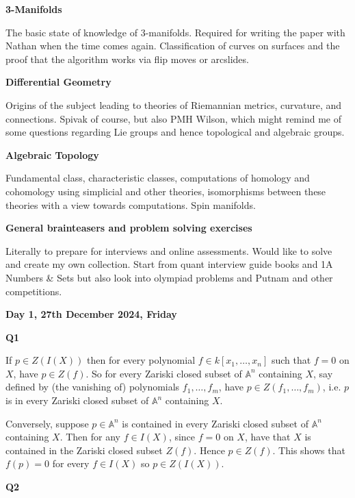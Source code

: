 \documentclass[hidelinks, 12pt]{article}
\theoremstyle{mydefstyle}
\theoremstyle{mythmstyle}
\begin{document}
\textbf{3-Manifolds}

The basic state of knowledge of 3-manifolds. Required for writing the paper with Nathan when the time comes again. Classification of curves on surfaces and the proof that the algorithm works via flip moves or arcslides. 

\textbf{Differential Geometry}

Origins of the subject leading to theories of Riemannian metrics, curvature, and connections. Spivak of course, but also PMH Wilson, which might remind me of some questions regarding Lie groups and hence topological and algebraic groups. 

\textbf{Algebraic Topology}

Fundamental class, characteristic classes, computations of homology and cohomology using simplicial and other theories, isomorphisms between these theories with a view towards computations. Spin manifolds. 

\textbf{General brainteasers and problem solving exercises}

Literally to prepare for interviews and online assessments. Would like to solve and create my own collection. Start from quant interview guide books and 1A Numbers \& Sets but also look into olympiad problems and Putnam and other competitions. 

\newpage

\textbf{Day 1, 27th December 2024, Friday}

\textbf{Q1} 

If $p \in Z(I(X))$ then for every polynomial $f \in k[x_1, \dots, x_n]$ such that $f = 0$ on $X$, have $p \in Z(f)$. So for every Zariski closed subset of $\mathbb{A}^n$ containing $X$, say defined by (the vanishing of) polynomials $f_1, \dots, f_m$, have $p \in Z(f_1, \dots, f_m)$, i.e. $p$ is in every Zariski closed subset of $\mathbb{A}^n$ containing $X$.

Conversely, suppose $p \in \mathbb{A}^n$ is contained in every Zariski closed subset of $\mathbb{A}^n$ containing $X$. Then for any $f \in I(X)$, since $f = 0$ on $X$, have that $X$ is contained in the Zariski closed subset $Z(f)$. Hence $p \in Z(f)$. This shows that $f(p) = 0$ for every $f \in I(X)$ so $p \in Z(I(X))$. 

\textbf{Q2}
\end{document}
